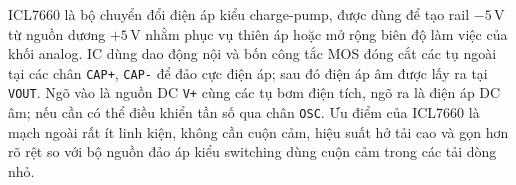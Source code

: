 ICL7660 là bộ chuyển đổi điện áp kiểu charge-pump, được dùng để tạo rail $-5\,\mathrm{V}$ từ nguồn dương $+5\,\mathrm{V}$ nhằm phục vụ thiên áp hoặc mở rộng biên độ làm việc của khối analog. IC dùng dao động nội và bốn công tắc MOS đóng cắt các tụ ngoài tại các chân \texttt{CAP+}, \texttt{CAP-} để đảo cực điện áp; sau đó điện áp âm được lấy ra tại \texttt{VOUT}. Ngõ vào là nguồn DC \texttt{V+} cùng các tụ bơm điện tích, ngõ ra là điện áp DC âm; nếu cần có thể điều khiển tần số qua chân \texttt{OSC}. Ưu điểm của ICL7660 là mạch ngoài rất ít linh kiện, không cần cuộn cảm, hiệu suất hở tải cao và gọn hơn rõ rệt so với bộ nguồn đảo áp kiểu switching dùng cuộn cảm trong các tải dòng nhỏ.



\newpage













